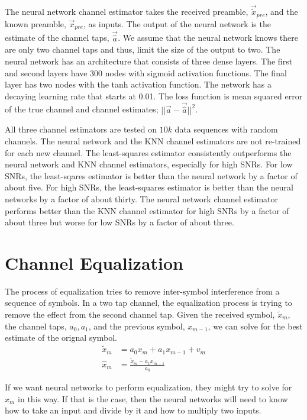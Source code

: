 The neural network channel estimator takes the received preamble, $\vec{\tilde{x}}_{pre}$, and the known preamble, $\vec{x}_{pre}$, as inputs.
The output of the neural network is the estimate of the channel taps, $\vec{\hat{a}}$.  We assume that the neural network knows there are only two channel taps and thus, limit the size of the output to two.
The neural network has an architecture that consists of three dense layers.  
The first and second layers have $300$ nodes with sigmoid activation functions.  The final layer has two nodes with the tanh activation function.  The network has a decaying learning rate that starts at 0.01. 
The loss function is mean squared error of the true channel and channel estimates; $||\vec{a}-\vec{\hat{a}}||^2$.

All three channel estimators are tested on $10k$ data sequences with random channels.  The neural network and the KNN channel estimators are not re-trained for each new channel.  The least-squares estimator consistently outperforms the neural network and KNN channel estimators, especially for high SNRs.  For low SNRs, the least-sqares estimator is better than the neural network by a factor of about five.  For high SNRs, the least-squares estimator is better than the neural networks by a factor of about thirty. 
The neural network channel estimator performs better than the KNN channel estimator for high SNRs by a factor of about three but worse for low SNRs by a factor of about three.


\section{Channel Equalization}

The process of equalization tries to remove inter-symbol interference from a sequence of symbols.  
In a two tap channel, the equalization process is trying to remove the effect from the second channel tap.  Given the received symbol, $\tilde{x}_m$, the channel taps, $a_0, a_1$, and the previous symbol, $x_{m-1}$, we can solve for the best estimate of the orignal symbol.
\begin{align}
\tilde{x}_m &= a_0 x_{m} + a_1 x_{m-1} + v_m\\
\hat{x}_m &= \frac{\tilde{x}_m - a_1 x_{m-1}}{a_0}
\end{align}

If we want neural networks to perform equalization, they might try to solve for $\hat{x}_m$ in this way.  
If that is the case, then the neural networks will need to know how to take an input and divide by it and how to multiply two inputs.  

